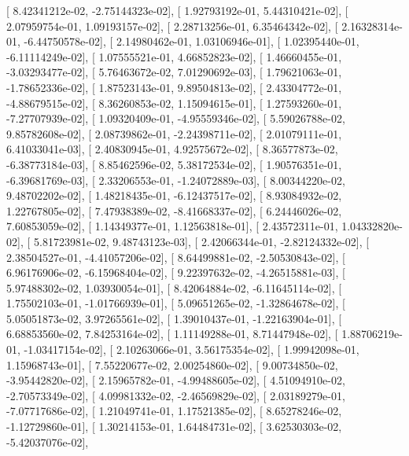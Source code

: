 \documentclass{article}
\begin{document}
       [  8.42341212e-02,  -2.75144323e-02],
       [  1.92793192e-01,   5.44310421e-02],
       [  2.07959754e-01,   1.09193157e-02],
       [  2.28713256e-01,   6.35464342e-02],
       [  2.16328314e-01,  -6.44750578e-02],
       [  2.14980462e-01,   1.03106946e-01],
       [  1.02395440e-01,  -6.11114249e-02],
       [  1.07555521e-01,   4.66852823e-02],
       [  1.46660455e-01,  -3.03293477e-02],
       [  5.76463672e-02,   7.01290692e-03],
       [  1.79621063e-01,  -1.78652336e-02],
       [  1.87523143e-01,   9.89504813e-02],
       [  2.43304772e-01,  -4.88679515e-02],
       [  8.36260853e-02,   1.15094615e-01],
       [  1.27593260e-01,  -7.27707939e-02],
       [  1.09320409e-01,  -4.95559346e-02],
       [  5.59026788e-02,   9.85782608e-02],
       [  2.08739862e-01,  -2.24398711e-02],
       [  2.01079111e-01,   6.41033041e-03],
       [  2.40830945e-01,   4.92575672e-02],
       [  8.36577873e-02,  -6.38773184e-03],
       [  8.85462596e-02,   5.38172534e-02],
       [  1.90576351e-01,  -6.39681769e-03],
       [  2.33206553e-01,  -1.24072889e-03],
       [  8.00344220e-02,   9.48702202e-02],
       [  1.48218435e-01,  -6.12437517e-02],
       [  8.93084932e-02,   1.22767805e-02],
       [  7.47938389e-02,  -8.41668337e-02],
       [  6.24446026e-02,   7.60853059e-02],
       [  1.14349377e-01,   1.12563818e-01],
       [  2.43572311e-01,   1.04332820e-02],
       [  5.81723981e-02,   9.48743123e-03],
       [  2.42066344e-01,  -2.82124332e-02],
       [  2.38504527e-01,  -4.41057206e-02],
       [  8.64499881e-02,  -2.50530843e-02],
       [  6.96176906e-02,  -6.15968404e-02],
       [  9.22397632e-02,  -4.26515881e-03],
       [  5.97488302e-02,   1.03930054e-01],
       [  8.42064884e-02,  -6.11645114e-02],
       [  1.75502103e-01,  -1.01766939e-01],
       [  5.09651265e-02,  -1.32864678e-02],
       [  5.05051873e-02,   3.97265561e-02],
       [  1.39010437e-01,  -1.22163904e-01],
       [  6.68853560e-02,   7.84253164e-02],
       [  1.11149288e-01,   8.71447948e-02],
       [  1.88706219e-01,  -1.03417154e-02],
       [  2.10263066e-01,   3.56175354e-02],
       [  1.99942098e-01,   1.15968743e-01],
       [  7.55220677e-02,   2.00254860e-02],
       [  9.00734850e-02,  -3.95442820e-02],
       [  2.15965782e-01,  -4.99488605e-02],
       [  4.51094910e-02,  -2.70573349e-02],
       [  4.09981332e-02,  -2.46569829e-02],
       [  2.03189279e-01,  -7.07717686e-02],
       [  1.21049741e-01,   1.17521385e-02],
       [  8.65278246e-02,  -1.12729860e-01],
       [  1.30214153e-01,   1.64484731e-02],
       [  3.62530303e-02,  -5.42037076e-02],
\end{document}
